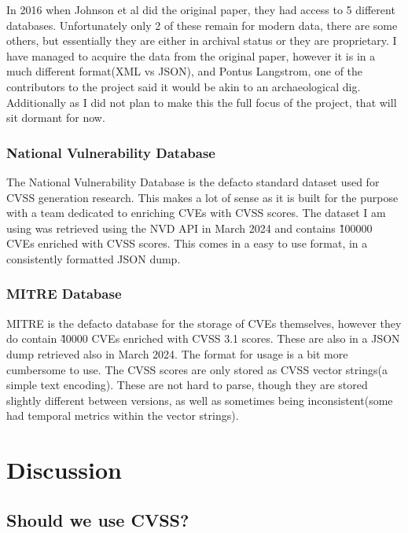 \documentclass[12pt]{article}
\begin{document}
In 2016 when Johnson et al\cite{bayes} did the original paper, they had access to 5 different databases. Unfortunately only 2 of these remain for
modern data, there are some others, but essentially they are either in archival status or they are proprietary. I have managed to acquire the data
from the original paper, however it is in a much different format(XML vs JSON), and Pontus Langstrom, one of the contributors to the project said it
would be akin to an archaeological dig. Additionally as I did not plan to make this the full focus of the project, that will sit dormant for now.

\subsubsection*{National Vulnerability Database}

The National Vulnerability Database is the defacto standard dataset used for CVSS generation research. This makes a lot of sense as it is built for
the purpose with a team dedicated to enriching CVEs with CVSS scores. The dataset I am using was retrieved using the NVD API in March 2024 and
contains \~100000 CVEs enriched with CVSS scores. This comes in a easy to use format, in a consistently formatted JSON dump.

\subsubsection*{MITRE Database}

MITRE is the defacto database for the storage of CVEs themselves, however they do contain \~40000 CVEs enriched with CVSS 3.1 scores. These are also
in a JSON dump retrieved also in March 2024. The format for usage is a bit more cumbersome to use. The CVSS scores are only stored as CVSS vector
strings(a simple text encoding). These are not hard to parse, though they are stored slightly different between versions, as well as sometimes being
inconsistent(some had temporal metrics within the vector strings).

\section{Discussion}

\subsection{Should we use CVSS?}
\end{document}
